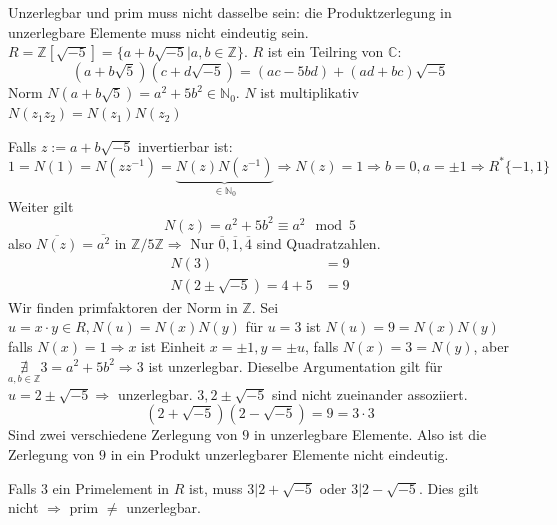 \documentclass{article}
\newcommand{\N}{\mathbb{N}}
\newcommand{\Z}{\mathbb{Z}}
\newcommand{\C}{\mathbb{C}}
\begin{document}
\color{purple}
Unzerlegbar und prim muss nicht dasselbe sein: die
Produktzerlegung in unzerlegbare Elemente muss nicht
eindeutig sein. $R=\Z[\sqrt{-5}]=\{a+b\sqrt{-5}|a,b\in\Z\}$.
$R$ ist ein Teilring von $\C:$
\begin{equation*}
    (a+b\sqrt{5})(c+d\sqrt{-5})=(ac-5bd)+(ad+bc)\sqrt{-5}
\end{equation*}
Norm $N(a+b\sqrt{5})=a^2+5b^2\in\N_0$.
$N$ ist multiplikativ $N(z_1z_2)=N(z_1)N(z_2)$

Falls $z:=a+b\sqrt{-5}$ invertierbar ist:
\begin{equation*}
    1=N(1)=N(zz^{-1})=\underbrace{N(z)N(z^{-1})}_{\in\N_0}
    \Rightarrow N(z)=1\Rightarrow b=0,a=\pm 1\Rightarrow
    R^*\{-1,1\}
\end{equation*}
Weiter gilt
\begin{equation*}
    N(z)=a^2+5b^2\equiv a^2\mod 5
\end{equation*}
also $\overline{N(z)}=\overline{a^2}$ in $\Z/5\Z\Rightarrow$
Nur $\overline{0},\overline{1},\overline{4}$ sind
Quadratzahlen.
\begin{align*}
    N(3)&=9\\
    N(2\pm\sqrt{-5})=4+5&=9
\end{align*}
Wir finden primfaktoren der Norm in $\Z$.
Sei $u=x\cdot y\in R,N(u)=N(x)N(y)$ für $u=3$ ist
$N(u)=9=N(x)N(y)$ falls $N(x)=1\Rightarrow x$ ist Einheit
$x=\pm 1,y=\pm u$, falls $N(x)=3=N(y)$, aber
$\underset{a,b\in\Z}\nexists 3=a^2+5b^2\Rightarrow 3$ ist
unzerlegbar.
Dieselbe Argumentation gilt für $u=2\pm\sqrt{-5}\Rightarrow$
unzerlegbar. $3,2\pm\sqrt{-5}$ sind nicht zueinander
assoziiert.
\begin{equation*}
    (2+\sqrt{-5})(2-\sqrt{-5})=9=3\cdot 3
\end{equation*}
Sind zwei verschiedene Zerlegung von $9$ in unzerlegbare
Elemente. Also ist die Zerlegung von $9$ in ein Produkt
unzerlegbarer Elemente nicht eindeutig.

Falls $3$ ein Primelement in $R$ ist, muss $3|2+\sqrt{-5}$
oder $3|2-\sqrt{-5}$. Dies gilt nicht $\Rightarrow$
prim $\neq$ unzerlegbar.
\color{black}
\end{document}
